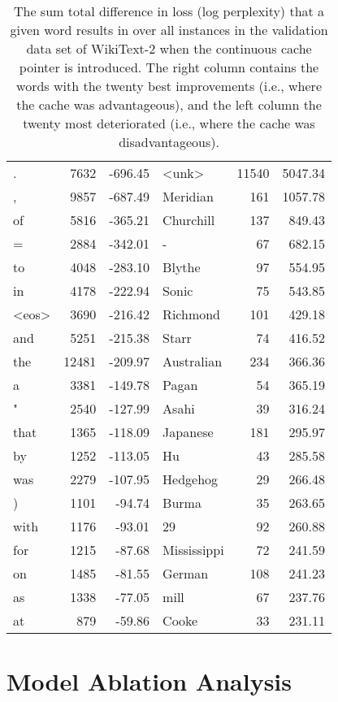 \documentclass{article}
\begin{document}
\begin{table}
\begin{center}
\begin{tabular}{lrr|lrr}
\midrule[0.2ex]
. & 7632 & -696.45 & <unk> & 11540 & 5047.34 \\
, & 9857 & -687.49 & Meridian & 161 & 1057.78 \\
of & 5816 & -365.21 & Churchill & 137 & 849.43 \\
= & 2884 & -342.01 & - & 67 & 682.15 \\
to & 4048 & -283.10 & Blythe & 97 & 554.95 \\
in & 4178 & -222.94 & Sonic & 75 & 543.85 \\
<eos> & 3690 & -216.42 & Richmond & 101 & 429.18 \\
and & 5251 & -215.38 & Starr & 74 & 416.52 \\
the & 12481 & -209.97 & Australian & 234 & 366.36 \\
a & 3381 & -149.78 & Pagan & 54 & 365.19 \\
" & 2540 & -127.99 & Asahi & 39 & 316.24 \\
that & 1365 & -118.09 & Japanese & 181 & 295.97 \\
by & 1252 & -113.05 & Hu & 43 & 285.58 \\
was & 2279 & -107.95 & Hedgehog & 29 & 266.48 \\
) & 1101 & -94.74 & Burma & 35 & 263.65 \\
with & 1176 & -93.01 & 29 & 92 & 260.88 \\
for & 1215 & -87.68 & Mississippi & 72 & 241.59 \\
on & 1485 & -81.55 & German & 108 & 241.23 \\
as & 1338 & -77.05 & mill & 67 & 237.76 \\
at & 879 & -59.86 & Cooke & 33 & 231.11 \\
\bottomrule[0.3ex]
\end{tabular}
\end{center}
\caption{
The sum total difference in loss (log perplexity) that a given word results in over all instances in the validation data set of WikiText-2 when the continuous cache pointer is introduced. The right column contains the words with the twenty best improvements (i.e., where the cache was advantageous), and the left column the twenty most deteriorated (i.e., where the cache was disadvantageous).}
\label{tb:ptranalysis}
\end{table}

\section{Model Ablation Analysis}
\end{document}
